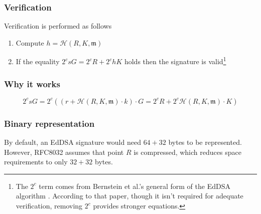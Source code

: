 \subsubsection{Verification}
Verification is performed as follows

\begin{enumerate}
	
	\item Compute \(h = \mathcal{H}(R,  K,  \mathfrak{m}) \)
	
	\item If the equality \(2^c s G = 2^c R + 2^c h K \) holds then the signature is valid\footnote{\label{2cprefix_note}The $2^c$ term comes from Bernstein et al.’s general form of the EdDSA algorithm \cite{cryptoeprint:2007:286}. According to that paper, though it isn’t required for adequate verification, removing $2^c$ provides stronger equations.}
	
\end{enumerate}


\subsubsection{Why it works}

\[ 2^c s G = 2^c ( (r + \mathcal{H}(R, K,  \mathfrak{m}) \cdot k) \cdot G = 2^c R + 2^c \mathcal{H}(R, K,  \mathfrak{m}) \cdot K )\]



\subsubsection{Binary representation}

By default, an EdDSA signature would need \(64 + 32 \) bytes to be represented.
However, RFC8032 assumes that point \(R\) is compressed, which reduces space requirements to only \(32 + 32\) bytes.